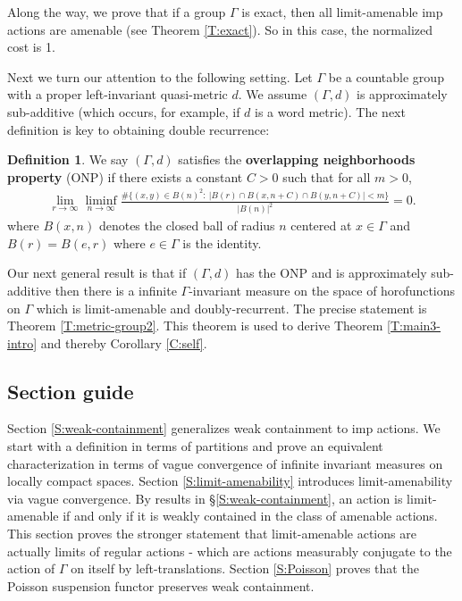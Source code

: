 \documentclass[12pt]{article}
\theoremstyle{plain}
\theoremstyle{definition}
\newtheorem{defn}{Definition}
\theoremstyle{remark}
\newtheorem{remark}{Remark}
\newcommand{\G}{\Gamma}
\newcommand{\eps}{\epsilon}
\begin{document}
Along the way, we prove that if a group $\G$ is exact, then all limit-amenable imp actions are amenable (see Theorem \ref{T:exact}). So in this case, the normalized cost is 1. 

Next we turn our attention to the following setting. Let $\G$ be a countable group with a proper left-invariant quasi-metric $d$. We assume $(\G,d)$ is approximately sub-additive (which occurs, for example, if $d$ is a word metric). The next definition is key to obtaining double recurrence:


\begin{defn}\label{D:onp}
    We say $(\G,d)$ satisfies the {\bf overlapping neighborhoods property} (ONP) if there exists a constant $C>0$ such that for all $m>0$, %
    \begin{align}\label{E:ONP}
\lim_{r\to\infty} \liminf_{n\to\infty}  \frac{\#\{(x,y) \in B(n)^2:~|B(r) \cap B(x,n+C) \cap B(y,n+C)| < m\}}{|B(n)|^2} =0.
\end{align}
where $B(x,n)$ denotes the closed ball of radius $n$ centered at $x\in \G$ and $B(r)=B(e,r)$ where $e\in \G$ is the identity.
\end{defn}

Our next general result is that if $(\G,d)$ has the ONP and is approximately sub-additive then there is a infinite $\G$-invariant measure on the space of horofunctions on $\G$ which is limit-amenable and doubly-recurrent. The precise statement is Theorem \ref{T:metric-group2}. This theorem is used to derive Theorem \ref{T:main3-intro} and thereby Corollary \ref{C:self}.





\subsection{Section guide}

Section \ref{S:weak-containment} generalizes weak containment to imp actions. We start with a definition in terms of partitions and prove an equivalent characterization in terms of vague convergence of infinite invariant measures on locally compact spaces. Section \ref{S:limit-amenability} introduces limit-amenability via vague convergence. By results in \S \ref{S:weak-containment}, an action is limit-amenable if and only if it is weakly contained in the class of amenable actions. This section proves the stronger statement that limit-amenable actions are actually limits of regular actions - which are actions measurably conjugate to the action of $\G$ on itself by left-translations. Section \ref{S:Poisson} proves that the Poisson suspension functor preserves weak containment.  
 
\end{document}
